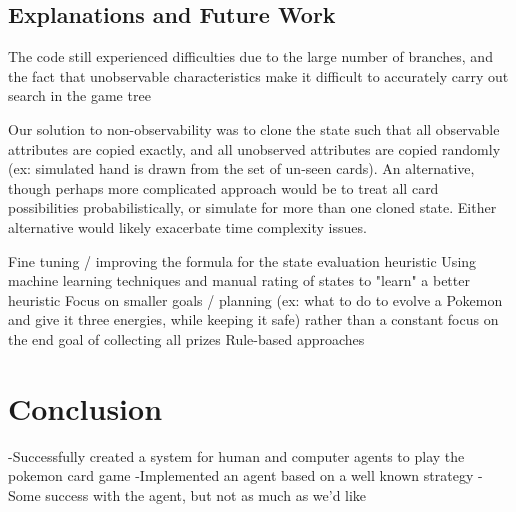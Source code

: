 \documentclass{article}
\begin{document}
\subsection{Explanations and Future Work} %
The code still experienced difficulties due to the large number of branches, and the fact that unobservable characteristics make it difficult to accurately carry out search in the game tree

Our solution to non-observability was to clone the state such that all observable attributes are copied exactly, and all unobserved attributes are copied randomly (ex: simulated hand is drawn from the set of un-seen cards). An alternative, though perhaps more complicated approach would be to treat all card possibilities probabilistically, or simulate for more than one cloned state.  Either alternative would likely exacerbate time complexity issues.

Fine tuning / improving the formula for the state evaluation heuristic 
Using machine learning techniques and manual rating of states to "learn" a better heuristic
Focus on smaller goals / planning (ex: what to do to evolve a Pokemon and give it three energies, while keeping it safe) rather than a constant focus on the end goal of collecting all prizes
Rule-based approaches

\section{Conclusion} %
-Successfully created a system for human and computer agents to play the pokemon card game
-Implemented an agent based on a well known strategy
-Some success with the agent, but not as much as we'd like

\nocite{langley00}



\end{document}
